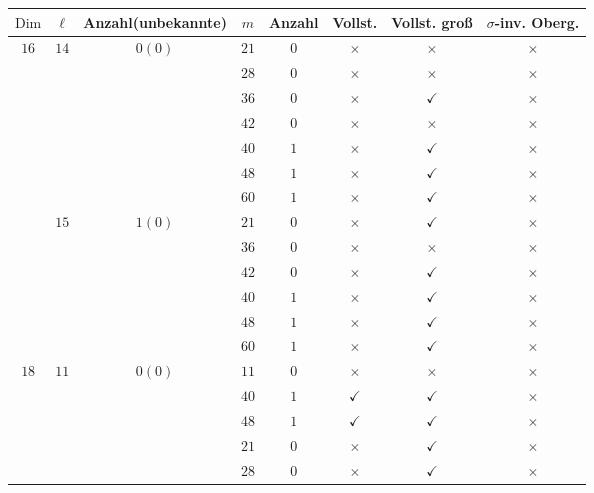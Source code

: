 \documentclass[12pt,a4paper,halfparskip,headsepline,bibtotocnumbered]{scrreprt}
\theoremstyle{nummermitklammern}
\theoremstyle{nonumberbreak}
\newcommand{\Dim}{\text{Dim}}
\begin{document}
\begin{table}[H]
	\centering
	\begin{tabular}{|c|c|c|c|c|c|c|c|}
		\hline		
		$\Dim$					&$\ell$					&{Anzahl(unbekannte)}		&$m$	&Anzahl	&Vollst.	&Vollst. groß	&$\sigma$-inv. Oberg.\\ \hline
		\multirow{13}{*}{$16$}	&\multirow{7}{*}{$14$}&\multirow{7}{*}{$0(0)$}		&$21$	&$0$	&$\times$		&$\times$		&$\times$\\ \cline{4-8}
								&						&							&$28$	&$0$	&$\times$		&$\times$		&$\times$\\ \cline{4-8}
								&						&							&$36$	&$0$	&$\times$		&$\checkmark$	&$\times$\\ \cline{4-8}
								&						&							&$42$	&$0$	&$\times$		&$\times$		&$\times$\\ \cline{4-8}
								&						&							&$40$	&$1$	&$\times$		&$\checkmark$	&$\times$\\ \cline{4-8}
								&						&							&$48$	&$1$	&$\times$		&$\checkmark$	&$\times$\\ \cline{4-8}
								&						&							&$60$	&$1$	&$\times$		&$\checkmark$	&$\times$\\ \cline{2-8}
								&\multirow{6}{*}{$15$}&\multirow{6}{*}{$1(0)$}		&$21$	&$0$	&$\times$		&$\checkmark$	&$\times$\\ \cline{4-8}
								&						&							&$36$	&$0$	&$\times$		&$\times$		&$\times$\\ \cline{4-8}
								&						&							&$42$	&$0$	&$\times$		&$\checkmark$	&$\times$\\ \cline{4-8}
								&						&							&$40$	&$1$	&$\times$		&$\checkmark$	&$\times$\\ \cline{4-8}
								&						&							&$48$	&$1$	&$\times$		&$\checkmark$	&$\times$\\ \cline{4-8}
								&						&							&$60$	&$1$	&$\times$		&$\checkmark$	&$\times$\\ \hline
		\multirow{4}{*}{$18$}	&\multirow{4}{*}{$11$}	&\multirow{4}{*}{$0(0)$}	&$11$	&$0$	&$\times$		&$\times$		&$\times$\\ \cline{4-8}
								&						&							&$40$	&$1$	&$\checkmark$	&$\checkmark$	&$\times$\\ \cline{4-8}
								&						&							&$48$	&$1$	&$\checkmark$	&$\checkmark$	&$\times$\\ \hline
		\multirow{9}{*}{$20$}	&\multirow{9}{*}{$3$}	&\multirow{9}{*}{$3(0)$}	&$21$	&$0$	&$\times$		&$\checkmark$	&$\times$\\ \cline{4-8}
								&						&							&$28$	&$0$	&$\times$		&$\checkmark$	&$\times$\\ \cline{4-8}

\end{tabular}
\end{table}
\end{document}
